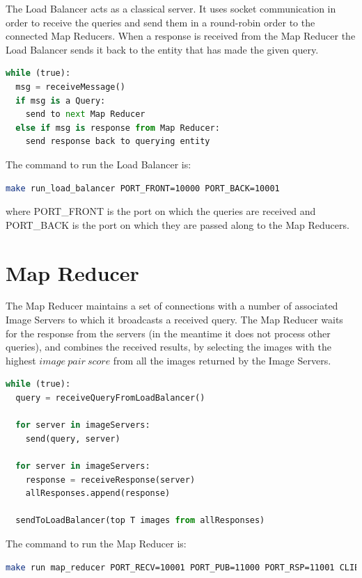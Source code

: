 The Load Balancer acts as a classical server. It uses socket communication in order to receive the queries and send them in a round-robin order to the connected Map Reducers. When a response is received from the Map Reducer the Load Balancer sends it back to the entity that has made the given query.\\

\begin{lstlisting}[language=python, caption=Load Balancer pseudocode]
while (true):
  msg = receiveMessage()
  if msg is a Query:
  	send to next Map Reducer
  else if msg is response from Map Reducer:
  	send response back to querying entity
\end{lstlisting}

The command to run the Load Balancer is:
\begin{lstlisting}[language=bash]
make run_load_balancer PORT_FRONT=10000 PORT_BACK=10001
\end{lstlisting}
where PORT_FRONT is the port on which the queries are received and PORT_BACK is the port on which they are passed along to the Map Reducers.

\section{Map Reducer}

The Map Reducer maintains a set of connections with a number of associated Image Servers to which it broadcasts a received query. The Map Reducer waits for the response from the servers (in the meantime it does not process other queries), and combines the received results, by selecting the images with the highest $image\ pair\ score$ from all the images returned by the Image Servers.\\

\begin{lstlisting}[language=python, caption=Map Reducer pseudocode]
while (true):
  query = receiveQueryFromLoadBalancer()
	
  for server in imageServers:
    send(query, server)
  
  for server in imageServers:
    response = receiveResponse(server)
    allResponses.append(response)
	
  sendToLoadBalancer(top T images from allResponses)
\end{lstlisting}

The command to run the Map Reducer is:
\begin{lstlisting}[language=bash]
make run map_reducer PORT_RECV=10001 PORT_PUB=11000 PORT_RSP=11001 CLIENTS=5
\end{lstlisting}

